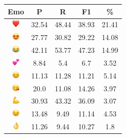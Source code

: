 \documentclass{article}
\begin{document}
\begin{table}
\centering
\begin{tabular}{|c|ccc|c|} \hline
\textbf{Emo} & \textbf{P} & \textbf{R} & \textbf{F1} & \textbf{\%} \\ \hline
\includegraphics[height=0.37cm,width=0.37cm]{img/red_heart.png} & 32.54 & 48.44 & 38.93 & 21.41\\ 
\includegraphics[height=0.37cm,width=0.37cm]{img/smiling_face_with_hearteyes.png} & 27.77 & 30.82 & 29.22 & 14.08\\ 
\includegraphics[height=0.37cm,width=0.37cm]{img/face_with_tears_of_joy.png} & 42.11 & 53.77 & 47.23 & 14.99\\ 
\includegraphics[height=0.37cm,width=0.37cm]{img/two_hearts.png} & 8.84 & 5.4 & 6.7 & 3.52\\ 
\includegraphics[height=0.37cm,width=0.37cm]{img/smiling_face_with_smiling_eyes.png} & 11.13 & 11.28 & 11.21 & 5.14\\ 
\includegraphics[height=0.37cm,width=0.37cm]{img/face_blowing_a_kiss.png} & 20.0 & 11.08 & 14.26 & 3.97\\ 
\includegraphics[height=0.37cm,width=0.37cm]{img/flexed_biceps.png} & 30.93 & 43.32 & 36.09 & 3.07\\ 
\includegraphics[height=0.37cm,width=0.37cm]{img/winking_face.png} & 13.48 & 9.49 & 11.14 & 4.53\\ 
\includegraphics[height=0.37cm,width=0.37cm]{img/OK_hand.png} & 11.26 & 9.44 & 10.27 & 1.8\\ 

\end{tabular}
\end{table}
\end{document}
